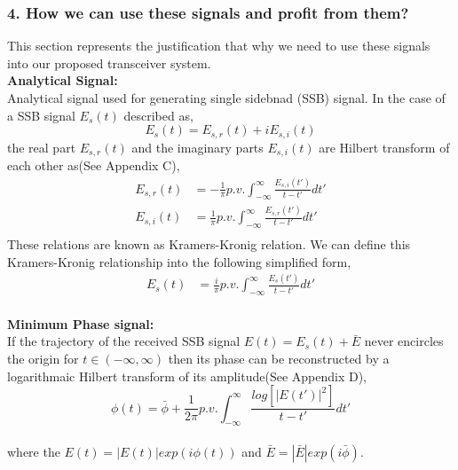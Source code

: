 \subsubsection{4. How we can use these signals and profit from them?}
This section represents the justification that why we need to use these signals into our proposed transceiver system.\\
\textbf{Analytical Signal:}\\
Analytical signal used for generating single sidebnad (SSB) signal. In the case of a SSB signal $E_s(t)$ described as,
\begin{equation}
E_s(t)=E_{s,r}(t)+iE_{s,i}(t)
\label{5.15}
\end{equation}
the real part $E_{s,r}(t)$  and the imaginary parts $E_{s,i}(t)$ are Hilbert transform of each other as(See Appendix C),
\begin{equation}
\begin{split}
E_{s,r}(t) &=-\frac{1}{\pi} p.v. \int_{-\infty}^{\infty} \frac{E_{s,i}(t')}{t-t'} dt' \\
E_{s,i}(t) &=\frac{1}{\pi} p.v. \int_{-\infty}^{\infty} \frac{E_{s,r}(t')}{t-t'} dt' \\
\end{split}
\label{E}
\end{equation}
These relations are known as Kramers-Kronig relation. We can define this Kramers-Kronig relationship into the following simplified form,
\begin{equation}
\begin{split}
E_{s}(t) &=\frac{i}{\pi} p.v. \int_{-\infty}^{\infty} \frac{E_{s}(t')}{t-t'} dt' 
\end{split}
\label{Eq:5.17}
\end{equation}\\
\textbf{Minimum Phase signal:}\\
If the trajectory of the received SSB signal $E(t)=E_{s}(t)+\bar{E}$ never encircles the origin for $t\in(-\infty,\infty)$ then its phase can be reconstructed by a logarithmaic Hilbert transform of its amplitude(See Appendix D),
\begin{equation}
\phi(t) = \bar{\phi} + \dfrac{1}{2\pi} p.v. \int_{-\infty}^{\infty} \dfrac{log[|E(t')|^2]}{t-t'} dt'
\end{equation}\\
where the $E(t)=|E(t)|exp(i\phi(t))$ and $\bar{E}=|\bar{E}|exp(i\bar{\phi})$.

